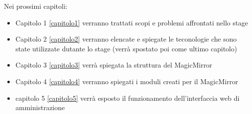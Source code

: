 Nei prossimi capitoli:
\begin{itemize}
\item Capitolo 1 \ref{capitolo1} verranno trattati scopi e problemi affrontati nello stage
\item Capitolo 2 \ref{capitolo2} verranno elencate e spiegate le teconologie che sono state utilizzate
dutante lo stage (verrà spostato poi come ultimo capitolo)
\item Capitolo 3 \ref{capitolo3} verr\`a spiegata la struttura del MagicMirror
\item Capitolo 4 \ref{capitolo4} verranno spiegati i moduli creati per il MagicMirror
\item capitolo 5 \ref{capitolo5} verrà esposto il funzionamento dell'interfaccia web di amministrazione
\end{itemize}
